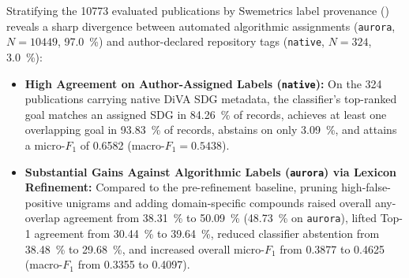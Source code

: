 Stratifying the \num{10773} evaluated publications by Swemetrics label provenance () reveals a sharp divergence between automated algorithmic assignments (\texttt{aurora}, $N = \num{10449}$, \qty{97.0}{\percent}) and author-declared repository tags (\texttt{native}, $N = \num{324}$, \qty{3.0}{\percent}):
\begin{itemize}
  \item \textbf{High Agreement on Author-Assigned Labels (\texttt{native}):} On the \num{324} publications carrying native \gls{DiVA} \gls{SDG} metadata, the classifier's top-ranked goal matches an assigned \gls{SDG} in \qty{84.26}{\percent} of records, achieves at least one overlapping goal in \qty{93.83}{\percent} of records, abstains on only \qty{3.09}{\percent}, and attains a micro-$F_1$ of \num{0.6582} (macro-$F_1 = \num{0.5438}$).
  
  \item \textbf{Substantial Gains Against Algorithmic Labels (\texttt{aurora}) via Lexicon Refinement:} Compared to the pre-refinement baseline, pruning high-false-positive unigrams and adding domain-specific compounds raised overall any-overlap agreement from \qty{38.31}{\percent} to \qty{50.09}{\percent} (\qty{48.73}{\percent} on \texttt{aurora}), lifted Top-1 agreement from \qty{30.44}{\percent} to \qty{39.64}{\percent}, reduced classifier abstention from \qty{38.48}{\percent} to \qty{29.68}{\percent}, and increased overall micro-$F_1$ from \num{0.3877} to \num{0.4625} (macro-$F_1$ from \num{0.3355} to \num{0.4097}).
\end{itemize}


